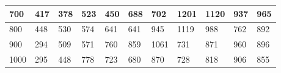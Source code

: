\documentclass[10pt,letterpaper]{article}
\begin{document}
\begin{center}
\begin{table}
\begin{tabular} { |m{0.5cm}|m{1.3cm}|m{1.3cm}|m{1.3cm}|m{1.3cm}|m{1.3cm}|m{1.3cm}|m{1.3cm}|m{1.3cm}|m{1.3cm}|m{1.3cm}|}
\hline
\cellcolor{Gray}700 & \Large 417 & \Large 378 & \Large 523 & \Large 450 & \Large 688 & \Large 702 & \Large 1201 & \Large 1120 & \Large 937 & \Large 965 \\
\hline
\cellcolor{Gray}800 & \Large 448 & \Large 530 & \Large 574 & \Large 641 & \Large 641 & \Large 945 & \Large 1119 & \Large 988 & \Large 762 & \Large 892 \\
\hline
\cellcolor{Gray}900 & \Large 294 & \Large 509 & \Large 571 & \Large 760 & \Large 859 & \Large 1061 & \Large 731 & \Large 871 & \Large 960 & \Large 896 \\
\hline
\cellcolor{Gray}1000 & \Large 295 & \Large 448 & \Large 778 & \Large 723 & \Large 680 & \Large 870 & \Large 728 & \Large 818 & \Large 906 & \Large 855 \\
\hline
\end{tabular} \\
\end{table}
\end{center}
\newpage 
{}
\end{document}
